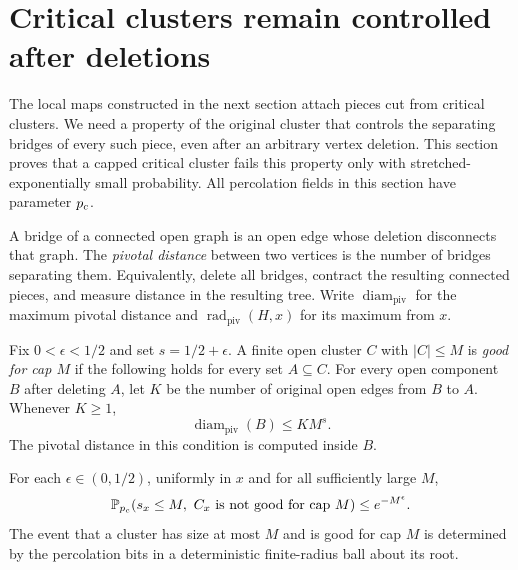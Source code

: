 \section{Critical clusters remain controlled after deletions}
\label{good:section}

The local maps constructed in the next section attach pieces cut from
critical clusters. We need a property of the original cluster that
controls the separating bridges of every such piece, even after an
arbitrary vertex deletion. This section proves that a capped critical
cluster fails this property only with stretched-exponentially small
probability. All percolation fields in this section have parameter
${p_c}$.

\begin{definition}
\label{good:definition}
A bridge of a connected open graph is an open edge whose deletion
disconnects that graph. The \emph{pivotal distance} between two vertices
is the number of bridges separating them. Equivalently, delete all
bridges, contract the resulting connected pieces, and measure distance
in the resulting tree. Write $\operatorname{diam}_{\mathrm{piv}}$ for
the maximum pivotal distance and
$\operatorname{rad}_{\mathrm{piv}}(H,x)$ for its maximum from $x$.

Fix $0<\epsilon<1/2$ and set $s=1/2+\epsilon$. A finite open cluster
$C$ with $|C|\le M$ is \emph{good for cap $M$} if the following holds
for every set $A\subseteq C$. For every open component $B$ after
deleting $A$, let $K$ be the number of original open edges from $B$
to $A$. Whenever $K\ge1$,
\[
 \operatorname{diam}_{\mathrm{piv}}(B)\le K M^s.
\]
The pivotal distance in this condition is computed inside $B$.
\end{definition}

\begin{proposition}\label{good:good-clusters}
For each $\epsilon\in(0,1/2)$, uniformly in $x$ and for all sufficiently
large $M$,
\begin{equation}\label{eq:s06}
 \mathbb P_{p_c}(s_x\le M,\ C_x\text{ is not good for cap }M)
 \le e^{-M^\epsilon}.
\end{equation}
The event that a cluster has size at most $M$ and is good for cap $M$
is determined by the percolation bits in a deterministic finite-radius
ball about its root.
\end{proposition}

